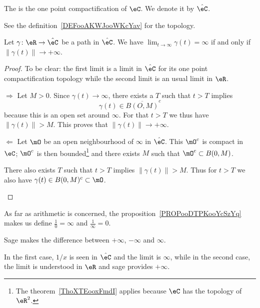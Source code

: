 \begin{definition}      \label{DEFooMAHAooGUYyqU}
    The  is the one point compactification of \( \eC\). We denote it by \( \hat \eC\).
\end{definition}
See the definition~\ref{DEFooAKWJooWKcYav} for the topology.

\begin{proposition}     \label{PROPooDTPKooYcSzYq}
    Let \( \gamma\colon \eR\to \hat \eC\) be a path in \( \hat \eC\). We have \( \lim_{t\to \infty} \gamma(t)=\infty\) if and only if \( \| \gamma(t) \|\to +\infty\).
\end{proposition}

\begin{proof}
    To be clear: the first limit is a limit in \( \hat \eC\) for its one point compactification topology while the second limit is an usual limit in \( \eR\).
    \begin{subproof}
    \item[\( \Rightarrow\)]
        Let \( M>0\). Since \( \gamma(t)\to \infty\), there exists a \( T\) such that \( t>T\) implies
        \begin{equation}
            \gamma(t)\in\overline{ B(O,M) }^c
        \end{equation}
        because this is an open set around \( \infty\). For that \( t>T\) we thus have \( \| \gamma(t) \|>M\). This proves that \( \| \gamma(t) \|\to +\infty\).
    \item[\( \Leftarrow\)]
        Let \( \mO\) be an open neighbourhood of \( \infty\) in \( \hat \eC\). This \( \mO^c\) is compact in \( \eC\); \( \mO^c\) is then bounded\footnote{The theorem~\ref{ThoXTEooxFmdI} applies because \( \eC\) has the topology of \( \eR^2\).} and there exists \( M\) such that \( \mO^c\subset B(0,M)\).

        There also exists \( T\) such that \( t>T\) implies \( \| \gamma(t) \|>M\). Thus for \( t>T\) we also have \( \gamma(t)\in B(0,M)^c\subset \mO\).
    \end{subproof}
\end{proof}

As far as arithmetic is concerned, the proposition~\ref{PROPooDTPKooYcSzYq} makes us  define \( \frac{1}{ 0 }=\infty\) and \( \frac{ 1 }{ \infty }=0\).

\begin{remark}
    
    Sage makes the difference between \( +\infty\), \( -\infty\) and \( \infty\).

    In the first case, \( 1/x\) is seen in \( \hat \eC\) and the limit is \( \infty\), while in the second case, the limit is understood in \( \eR\) and sage provides \( +\infty\).
\end{remark}

